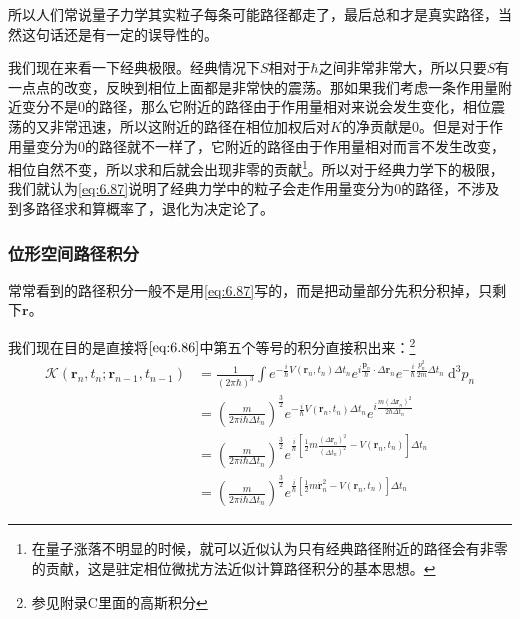 \documentclass[a4paper,zihao=-4,linespread=1]{ctexrep}
\begin{document}
	所以人们常说量子力学其实粒子每条可能路径都走了，最后总和才是真实路径，当然这句话还是有一定的误导性的。
	
	我们现在来看一下经典极限。经典情况下$S$相对于$\hbar$之间非常非常大，所以只要$S$有一点点的改变，反映到相位上面都是非常快的震荡。那如果我们考虑一条作用量附近变分不是0的路径，那么它附近的路径由于作用量相对来说会发生变化，相位震荡的又非常迅速，所以这附近的路径在相位加权后对$K$的净贡献是$0$。但是对于作用量变分为$0$的路径就不一样了，它附近的路径由于作用量相对而言不发生改变，相位自然不变，所以求和后就会出现非零的贡献\footnote{在量子涨落不明显的时候，就可以近似认为只有经典路径附近的路径会有非零的贡献，这是驻定相位微扰方法近似计算路径积分的基本思想。}。所以对于经典力学下的极限，我们就认为\ref{eq:6.87}说明了经典力学中的粒子会走作用量变分为$0$的路径，不涉及到多路径求和算概率了，退化为决定论了。
	
	\subsubsection*{位形空间路径积分}
	常常看到的路径积分一般不是用\ref{eq:6.87}写的，而是把动量部分先积分积掉，只剩下$\mathbf{r}$。
	
	我们现在目的是直接将$\ref{eq:6.86}$中第五个等号的积分直接积出来：\footnote{参见附录C里面的高斯积分}
	\begin{equation}
		\label{eq:6.88}
		\begin{aligned}
			\mathcal{K}\left(\mathbf{r}_n, t_n ; \mathbf{r}_{n-1}, t_{n-1}\right) & =\frac{1}{(2 \pi \hbar)^3} \int e^{-\frac{i}{\hbar} V\left(\mathbf{r}_n, t_n\right) \Delta t_n} e^{i \frac{\mathbf{p}_n}{\hbar} \cdot \Delta \mathbf{r}_n} e^{-\frac{i}{\hbar} \frac{p_n^2}{2 m} \Delta t_n} \mathrm{~d}^3{p}_n \\
			& =\left(\frac{m}{2 \pi i \hbar \Delta t_n}\right)^{\frac{3}{2}} e^{-\frac{i}{\hbar} V\left(\mathbf{r}_n, t_n\right) \Delta t_n} e^{i \frac{m\left(\Delta \mathbf{r}_n\right)^2}{2 \hbar \Delta t_n}} \\
			& =\left(\frac{m}{2 \pi i \hbar \Delta t_n}\right)^{\frac{3}{2}} e^{\frac{i}{\hbar}\left[\frac{1}{2} m \frac{\left(\Delta \mathbf{r}_n\right)^2}{\left(\Delta t_n\right)^2}-V\left(\mathbf{r}_n, t_n\right)\right] \Delta t_n} \\
			& =\left(\frac{m}{2 \pi i \hbar \Delta t_n}\right)^{\frac{3}{2}} e^{\frac{i}{\hbar}\left[\frac{1}{2} m \dot{\mathbf{r}}_n^2-V\left(\mathbf{r}_n, t_n\right)\right] \Delta t_n}
		\end{aligned}
	\end{equation}
	
\end{document}
